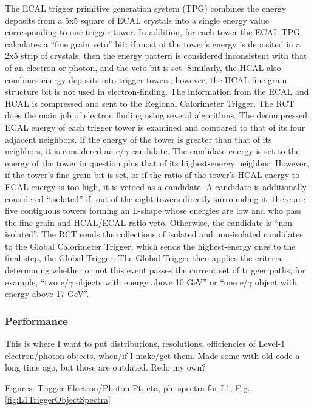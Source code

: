 The ECAL trigger primitive generation system (TPG) combines the energy deposits 
from a 5x5 square of ECAL crystals into a single energy value corresponding to 
one trigger tower.%
In addition, for each tower the ECAL TPG calculates a ``fine grain veto'' bit: 
if most of the tower's energy is deposited in a 2x5 strip of crystals, 
then the energy pattern is considered inconsistent with that of an electron
or photon, 
and the veto bit is set.  
Similarly, the HCAL also combines energy deposits into trigger towers; 
however, the HCAL fine grain structure bit is not used in electron-finding.  
The information from the ECAL and HCAL is compressed and sent to the 
Regional Calorimeter Trigger.  
The RCT does the main job of electron finding using several algorithms.  
The decompressed ECAL energy of each trigger tower is examined and 
compared to that of its four adjacent neighbors.  
If the energy of the tower is greater than that of its neighbors, 
it is considered an e/$\gamma$ candidate.  
The candidate energy is set to the energy of the tower in question 
plus that of its highest-energy neighbor.  
However, if the tower's fine grain bit is set, 
or if the ratio of the tower's HCAL energy to ECAL energy is too high, 
it is vetoed as a candidate.  
A candidate is additionally considered ``isolated'' if, 
out of the eight towers directly surrounding it, 
there are five contiguous towers forming an L-shape whose 
energies are low and who pass the fine grain and HCAL/ECAL ratio veto.  
Otherwise, the candidate is ``non-isolated''.  
The RCT sends the collections of isolated and non-isolated candidates to the 
Global Calorimeter Trigger, 
which sends the highest-energy ones to the final step, the Global Trigger.  
The Global Trigger then applies the criteria determining whether or not 
this event passes the current set of trigger paths,
for example, ``two e/$\gamma$ objects with energy above 10 GeV'' 
or ``one e/$\gamma$ object with energy above 17 GeV''.  


\subsubsection{Performance}
This is where I want to put distributions, resolutions, efficiencies of Level-1 electron/photon objects, 
when/if I make/get them.  Made some with old code a long time ago, but those are outdated.  
Redo my own?

Figures: Trigger Electron/Photon Pt, eta, phi spectra for L1, Fig. \ref{fig:L1TriggerObjectSpectra}

